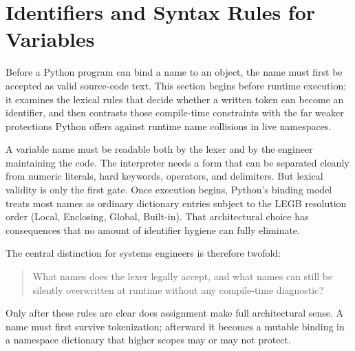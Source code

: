 \section{Identifiers and Syntax Rules for Variables}

Before a Python program can bind a name to an object, the name must first be accepted as valid source-code text. This section begins before runtime execution: it examines the lexical rules that decide whether a written token can become an identifier, and then contrasts those compile-time constraints with the far weaker protections Python offers against runtime name collisions in live namespaces.

A variable name must be readable both by the lexer and by the engineer maintaining the code. The interpreter needs a form that can be separated cleanly from numeric literals, hard keywords, operators, and delimiters. But lexical validity is only the first gate. Once execution begins, Python's binding model treats most names as ordinary dictionary entries subject to the LEGB resolution order (Local, Enclosing, Global, Built-in). That architectural choice has consequences that no amount of identifier hygiene can fully eliminate.

The central distinction for systems engineers is therefore twofold:

\begin{quote}
What names does the lexer legally accept, and what names can still be silently overwritten at runtime without any compile-time diagnostic?
\end{quote}

Only after these rules are clear does assignment make full architectural sense. A name must first survive tokenization; afterward it becomes a mutable binding in a namespace dictionary that higher scopes may or may not protect.
